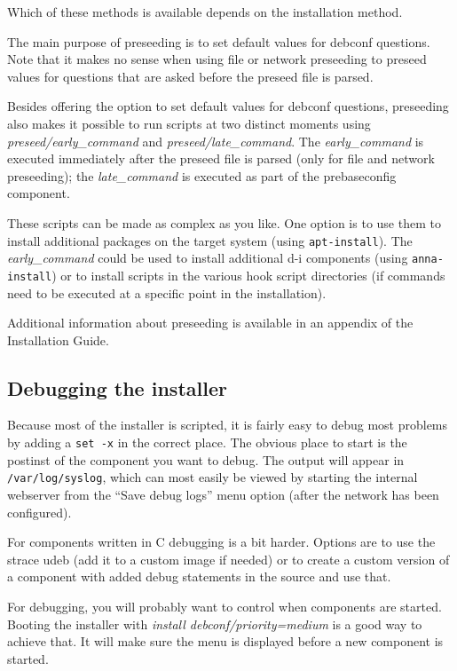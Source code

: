\documentclass[a4paper,10pt]{article}
\begin{document}
Which of these methods is available depends on the installation method. 

The main purpose of preseeding is to set default values for debconf questions. Note that it makes no sense when using file or network preseeding to preseed values for questions that are asked before the preseed file is parsed. 

Besides offering the option to set default values for debconf questions, preseeding also makes it possible to run scripts at two distinct moments using \textit{preseed/early\_command} and \textit{preseed/late\_command}. The \textit{early\_command} is executed immediately after the preseed file is parsed (only for file and network preseeding); the \textit{late\_command} is executed as part of the prebaseconfig component. 

These scripts can be made as complex as you like. One option is to use them to install additional packages on the target system (using \texttt{apt-install}). The \textit{early\_command} could be used to install additional d-i components (using \texttt{anna-install}) or to install scripts in the various hook script directories (if commands need to be executed at a specific point in the installation). 

Additional information about preseeding is available in an appendix of the Installation Guide. 


\subsection{Debugging the installer}
Because most of the installer is scripted, it is fairly easy to debug most problems by adding a \texttt{set -x} in the correct place. The obvious place to start is the postinst of the component you want to debug. The output will appear in \texttt{/var/log/syslog}, which can most easily be viewed by starting the internal webserver from the “Save debug logs” menu option (after the network has been configured). 

For components written in C debugging is a bit harder. Options are to use the strace udeb (add it to a custom image if needed) or to create a custom version of a component with added debug statements in the source and use that. 

For debugging, you will probably want to control when components are started. Booting the installer with \textit{install debconf/priority=medium} is a good way to achieve that. It will make sure the menu is displayed before a new component is started. 
\end{document}
